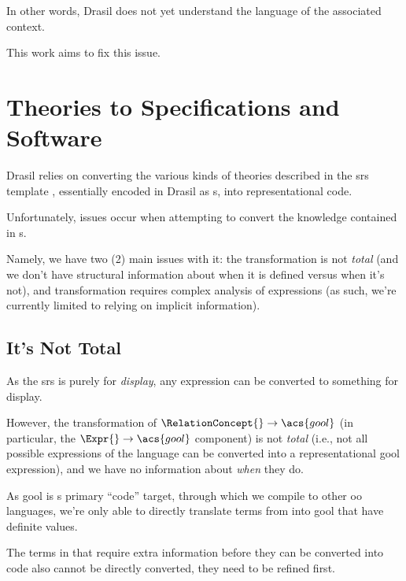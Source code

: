 In other words, Drasil does not yet understand the language of the associated
context.

This work aims to fix this issue.




\section{Theories to Specifications and Software}

Drasil relies on converting the various kinds of theories described in the
\acs{srs} template \cite{SmithAndLai2005}, essentially encoded in Drasil as
\RelationConcept{}s, into representational code.


Unfortunately, issues occur when attempting to convert the knowledge contained
in \RelationConcept{}s.

Namely, we have two (2) main issues with it: the transformation is not
\textit{total} (and we don't have structural information about when it is
defined versus when it's not), and transformation requires complex analysis of
expressions (as such, we're currently limited to relying on implicit
information).



\subsection{It's Not Total}



As the \acs{srs} is purely for \textit{display}, any \Expr{} expression can be
converted to something for display.

However, the transformation of \(\RelationConcept{} \rightarrow \acs{gool}\) (in
particular, the \(\Expr{} \rightarrow \acs{gool}\) component) is not
\textit{total} (i.e., not all possible expressions of the \Expr{} language can
be converted into a representational \acs{gool} expression), and we have no
information about \textit{when} they do.

As \acs{gool} is \Expr{}s primary ``code'' target, through which we compile to
other \acs{oo} languages, we're only able to directly translate terms from
\Expr{} into \acs{gool} that have definite values.

The terms in \Expr{} that require extra information before they can be converted
into code also cannot be directly converted, they need to be refined first.

